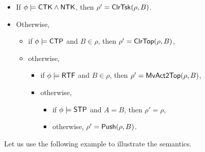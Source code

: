\begin{itemize}
    \item If $\phi\models{\sf CTK}\wedge{\sf NTK}$, then $\rho' = \mathsf{ClrTsk}(\rho, B)$.
    \item Otherwise,
    \begin{itemize}
        \item if $\phi \models{\sf CTP}$ and $B \in \rho$, then $\rho' =\mathsf{ClrTop}(\rho, B)$,
		\item otherwise,
		\begin{itemize}
			\item if $\phi \models {\sf RTF}$ and $B \in \rho$, then $\rho'=\mathsf{MvAct2Top}(\rho, B)$,
			\item otherwise,
			\begin{itemize}
				\item if $\phi \models {\sf STP}$ and $A = B$, then $\rho' = \rho$,
				\item otherwise, $\rho' = \mathsf{Push}(\rho, B)$.
			\end{itemize}
		\end{itemize}
    \end{itemize}
\end{itemize}
Let us use the following example to illustrate the semantics.
